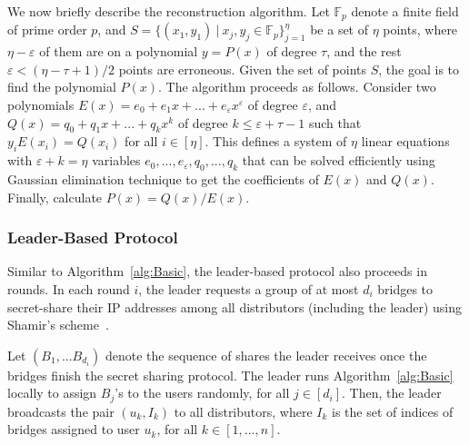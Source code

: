 \documentclass[letterpaper,twocolumn,10pt]{article}
\newcommand{\fullpaper}[1]{#1}
\newcommand{\fullpaper}[1]{}
\begin{document}
\fullpaper{We now briefly describe the reconstruction algorithm. Let $\mathbb{F}_{p}$ denote a finite field of prime order $p$, and $S=\{(x_{1},y_{1})\:|\:x_{j},y_{j}\in\mathbb{F}_{p}\}_{j=1}^{\eta}$ be a set of $\eta$ points, where $\eta-\varepsilon$ of them are on a polynomial $y=P(x)$ of degree $\tau$, and the rest $\varepsilon<(\eta-\tau+1)/2$ points are erroneous. Given the set of points $S$, the goal is to find the polynomial $P(x)$. The algorithm proceeds as follows. Consider two polynomials $E(x)=e_{0}+e_{1}x+...+e_{\varepsilon}x^{\varepsilon}$ of degree $\varepsilon$, and $Q(x)=q_{0}+q_{1}x+...+q_{k}x^{k}$ of degree $k\leq\varepsilon+\tau-1$ such that $y_{i}E(x_{i})=Q(x_{i})$ for all $i\in[\eta]$. This defines a system of $\eta$ linear equations with $\varepsilon+k=\eta$ variables $e_{0},...,e_{\varepsilon},q_{0},...,q_{k}$ that can be solved efficiently using Gaussian elimination technique to get the coefficients of $E(x)$ and $Q(x)$. Finally, calculate $P(x)=Q(x)/E(x)$.}

\subsubsection{Leader-Based Protocol} \label{sec:leader-alg}

Similar to Algorithm~\ref{alg:Basic}, the leader-based protocol also proceeds in rounds. In each round $i$, the leader requests a group of at most $d_i$ bridges to secret-share their IP addresses among all distributors (including the leader) using Shamir's scheme~\cite{shamir:how}. 

Let $(B_1,...B_{d_i})$ denote the sequence of shares the leader receives once the bridges finish the secret sharing protocol. The leader runs Algorithm~\ref{alg:Basic} locally to assign $B_j$'s to the users randomly, for all ${j \in [d_i]}$. Then, the leader broadcasts the pair $(u_k, I_k)$ to all distributors, where $I_k$ is the set of indices of bridges assigned to user $u_k$, for all $k \in [1,...,n]$.
\end{document}
